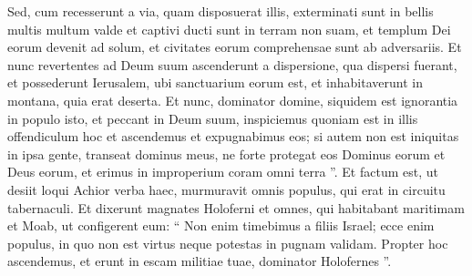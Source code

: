 \begin{biblechapter}
\begin{biblechapter}
\begin{biblechapter}
\begin{biblechapter}
\begin{biblechapter}
 \verse Sed, cum recesserunt a via, quam disposuerat illis, exterminati sunt in bellis multis multum valde et captivi ducti sunt in terram non suam, et templum Dei eorum devenit ad solum, et civitates eorum comprehensae sunt ab adversariis. 
 \verse Et nunc revertentes ad Deum suum ascenderunt a dispersione, qua dispersi fuerant, et possederunt Ierusalem, ubi sanctuarium eorum est, et inhabitaverunt in montana, quia erat deserta. 
\verse Et nunc, dominator domine, siquidem est ignorantia in populo isto, et peccant in Deum suum, inspiciemus quoniam est in illis offendiculum hoc et ascendemus et expugnabimus eos; 
\verse si autem non est iniquitas in ipsa gente, transeat dominus meus, ne forte protegat eos Dominus eorum et Deus eorum, et erimus in improperium coram omni terra ”. 
\verse Et factum est, ut desiit loqui Achior verba haec, murmuravit omnis populus, qui erat in circuitu tabernaculi. Et dixerunt magnates Holoferni et omnes, qui habitabant maritimam et Moab, ut configerent eum: 
\verse “ Non enim timebimus a filiis Israel; ecce enim populus, in quo non est virtus neque potestas in pugnam validam. 
\verse Propter hoc ascendemus, et erunt in escam militiae tuae, dominator Holofernes ”.
 

\end{biblechapter}
\end{biblechapter}
\end{biblechapter}
\end{biblechapter}
\end{biblechapter}

